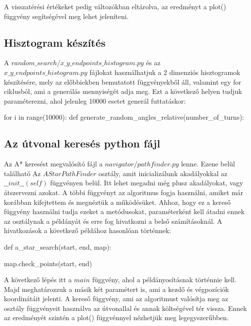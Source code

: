 A visszatérési értékeket pedig változókban eltárolva, az eredményt a plot() függvény segítségével meg lehet jeleníteni. 

\subsection{Hisztogram készítés}

A $ random\_search/x\_y\_endpoints\_histogram.py $ és az\\ $ x\_y\_endpoints\_histogram.py $ fájlokat használhatjuk a 2 dimenziós hisztogramok készítésére, mely az előbbiekben bemutatott függvényekből áll, valamint egy for ciklusból, ami a generálás mennyiségét adja meg. Ezt a következő helyen tudjuk paraméterezni, ahol jelenleg 10000 esetet generál futtatáskor:

\begin{python}
for i in range(10000):
    def generate_random_angles_relative(number_of_turns):
\end{python}


\subsection{Az útvonal keresés python fájl}

Az A* keresést megvalósító fájl a $ navigator/pathfinder.py $ lenne. Ezene belül található Az $ AStarPathFinder $ osztály, amit inicializálunk akadályokkal az $\_\_init\_\_(self)$ függvényen belül. Itt lehet megadni még plusz akadályokat, vagy átszervezni azokat. A többi függvényt az algoritmus fogja használni, amiket már korábban kifejtettem és megnéztük a működésüket. Ahhoz, hogy ez a kereső függvény használni tudja ezeket a metódusokat, paraméterként kell átadni ennek az osztálynak a példányát és erre fog hivatkozni a belső számításoknál. A hivatkozások a következő példához hasonlóan történnek:

\begin{python}
def a_star_search(start, end, map):

	map.check_points(start, end)
\end{python}

A következő lépés itt a $ main $ függvény, ahol a példányosításnak történnie kell. Majd meghatározzuk a másik két paramétert is, ami a kezdő és végpozíciók koordinátáit jelenti. A kereső függvény, ami az algoritmust valósítja meg az osztály függvényeit használva az útvonallal és annak költségével tér vissza. Ennek az eredményét szintén a plot() függvénnyel nézhetjük meg legegyszerűbben.


